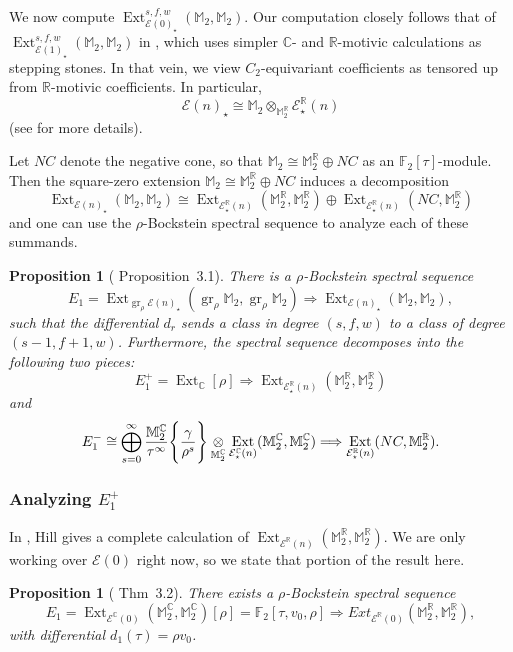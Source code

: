 \documentclass{amsart}
\newtheorem{proposition}[equation]{Proposition}
\theoremstyle{plain}
\numberwithin{equation}{section}
\numberwithin{figure}{section}
\DeclareMathOperator{\Ext}{Ext}
\DeclareMathOperator{\gr}{gr}
\newcommand{\mC}{{\mathbb C}}
\newcommand{\mF}{{\mathbb F}}
\newcommand{\mM}{{\mathbb M}}
\newcommand{\mR}{{\mathbb R}}
\newcommand{\cE}{{\mathcal E}}
\newcommand{\0}{\langle 0 \rangle }
\begin{document}
We now compute $\Ext_{\cE(0)_{\star}}^{s,f,w} (\mM_2, \mM_2).$ Our computation closely follows that of \newline $\Ext_{\cE(1)_{\star}}^{s,f,w} (\mM_2, \mM_2) $ in \cite{GuillouHillIsaksenRavenel2020}, which uses simpler $\mC$- and $\mR$-motivic calculations as stepping stones. In that vein, we view $C_2$-equivariant coefficients as tensored up from $\mR$-motivic coefficients. In particular, 
\[ \cE(n)_\star \cong \mM_{2} \otimes_{{\mM}_{2}^{\mR} }\cE_{\star}^{\mR}(n)\]
(see \cite[Equation~2.4]{GuillouHillIsaksenRavenel2020} for more details).

Let $NC$ denote the negative cone, so that $\mM_2 \cong \mM_{2}^{\mR} \oplus NC$ as an $\mF_{2}[\tau]$-module. Then the square-zero extension $\mM_{2} \cong \mM_{2}^{\mR} \oplus NC$ induces a decomposition \cite[page~8]{GuillouHillIsaksenRavenel2020} 
\[ \Ext_{\cE(n)_\star}(\mM_{2}, \mM_{2}) \cong \Ext_{\cE_{\star}^{\mR}(n)}(\mM_{2}^{\mR}, \mM_{2}^{\mR}) \oplus \Ext_{\cE_{\star}^{\mR}(n)}(NC, \mM_{2}^{\mR})  \]
and one can use the $\rho$-Bockstein spectral sequence to analyze each of these summands. 

\begin{proposition}[\cite{GuillouHillIsaksenRavenel2020} Proposition~3.1] \label{prop:rhoBockstein}
  There is a $\rho$-Bockstein spectral sequence
  \[ E_{1} = \Ext_{\gr_{\rho} \cE(n)_\star}(\gr_{\rho} \mM_2, \gr_{\rho} \mM_2) \Longrightarrow \Ext_{\cE(n)_\star}(\mM_{2}, \mM_{2}) ,\]
  such that the differential $d_{r}$ sends a class in degree $(s,f,w)$ to a class of degree $(s-1, f+1, w)$. Furthermore, the spectral sequence decomposes into the following two pieces:
  \[ E_{1}^{+} = \Ext_{\mC}[\rho] \Longrightarrow \Ext_{\cE_{\star}^{\mR}(n)}(\mM_{2}^{\mR}, \mM_{2}^{\mR}) \]
  and 
  \[ E_{1}^{-} \cong \bigoplus\limits_{s=0}^{\infty} \frac{\mM_{2}^{\mC}}{\tau^{\infty}} \Bigg{\{ } \frac{\gamma}{\rho^{s}} \Bigg{ \} } \underset{\mM_{2}^{\mC}}{\otimes} \Ext_{\cE_\star^{\mC}(n)} (\mM_{2}^{\mC}, \mM_{2}^{\mC})   \Longrightarrow \Ext_{\cE_{\star}^{\mR}(n)}(NC, \mM_{2}^{\mR}). \]
\end{proposition}

\subsubsection{Analyzing $E_{1}^{+}$}\label{sec: positive cone HZ} In \cite{Hill11}, Hill gives a complete calculation of $\Ext_{\cE^{\mR}(n)}(\mM_{2}^\mR, \mM_{2}^\mR).$ We are only working over $\cE(0)$ right now, so we state that portion of the result here. 
\begin{proposition}[\cite{Hill11} Thm~3.2]
    There exists a $\rho$-Bockstein spectral sequence 
\[ E_{1} = \Ext_{\cE^{\mC}(0)}(\mM_{2}^{\mC}, \mM_{2}^{\mC})[\rho] = \mF_{2}[\tau, v_{0}, \rho] \Longrightarrow Ext_{\cE^{\mR}(0)}(\mM_{2}^{\mR}, \mM_{2}^{\mR}),\]
with differential $d_{1}(\tau) = \rho v_{0}$.
\end{proposition}
\end{document}
